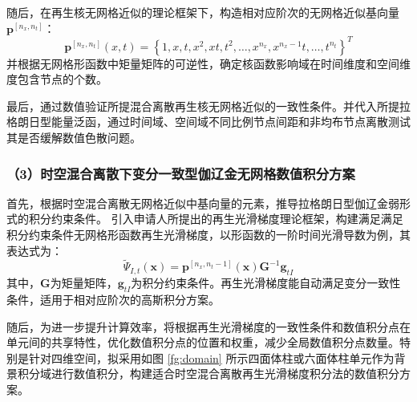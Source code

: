 随后，在再生核无网格近似的理论框架下，构造相对应阶次的无网格近似基向量$\boldsymbol p^{[n_x,n_t]}$：
\begin{equation}
    \boldsymbol p^{[n_x,n_t]}(x,t) = \left \{1, x, t, x^2, xt, t^2, \dots, x^{n_x}, x^{n_x-1}t, \dots, t^{n_t} \right \}^T
\end{equation}
并根据无网格形函数中矩量矩阵的可逆性，确定核函数影响域在时间维度和空间维度包含节点的个数。

    

最后，通过数值验证所提混合离散再生核无网格近似的一致性条件。并代入所提拉格朗日型能量泛函，通过时间域、空间域不同比例节点间距和非均布节点离散测试其是否缓解数值色散问题。

\subsubsection*{\bfseries （3）时空混合离散下变分一致型伽辽金无网格数值积分方案}
首先，根据时空混合离散无网格近似中基向量的元素，推导拉格朗日型伽辽金弱形式的积分约束条件。
引入申请人所提出的再生光滑梯度理论框架，构建满足满足积分约束条件无网格形函数再生光滑梯度，以形函数的一阶时间光滑导数为例，其表达式为：
\begin{equation}
    \tilde \Psi_{I,t}(\boldsymbol x) = \boldsymbol p^{[n_x,n_t - 1]}(\boldsymbol x) \boldsymbol G^{ - 1} \boldsymbol g_{tI}
\end{equation}
其中，$\boldsymbol G$为矩量矩阵，$\boldsymbol g_{tI}$为积分约束条件。再生光滑梯度能自动满足变分一致性条件，适用于相对应阶次的高斯积分方案。

随后，为进一步提升计算效率，将根据再生光滑梯度的一致性条件和数值积分点在单元间的共享特性，优化数值积分点的位置和权重，减少全局数值积分点数量。特别是针对四维空间，拟采用如图 \ref{fg:domain} 所示四面体柱或六面体柱单元作为背景积分域进行数值积分，构建适合时空混合离散再生光滑梯度积分法的数值积分方案。

